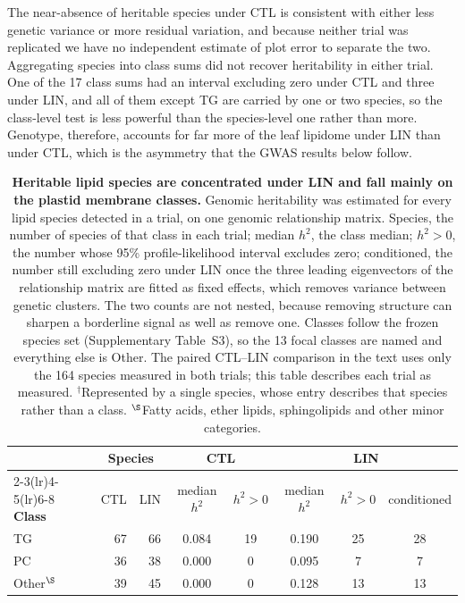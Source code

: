 \documentclass[9pt,twocolumn,twoside]{rilabRxiv}
\begin{document}
The near-absence of heritable species under CTL is consistent with either less genetic variance or more residual variation, and because neither trial was replicated we have no independent estimate of plot error to separate the two. Aggregating species into class sums did not recover heritability in either trial. One of the 17 class sums had an interval excluding zero under CTL and three under LIN, and all of them except TG are carried by one or two species, so the class-level test is less powerful than the species-level one rather than more. Genotype, therefore, accounts for far more of the leaf lipidome under LIN than under CTL, which is the asymmetry that the GWAS results below follow.


\begin{table}[!ht]
\centering
\caption{\textbf{Heritable lipid species are concentrated under LIN and fall mainly on the plastid membrane classes.} Genomic heritability was estimated for every lipid species detected in a trial, on one genomic relationship matrix. Species, the number of species of that class in each trial; median $h^2$, the class median; $h^2>0$, the number whose 95\% profile-likelihood interval excludes zero; conditioned, the number still excluding zero under LIN once the three leading eigenvectors of the relationship matrix are fitted as fixed effects, which removes variance between genetic clusters. The two counts are not nested, because removing structure can sharpen a borderline signal as well as remove one. Classes follow the frozen species set (Supplementary Table~S3), so the 13 focal classes are named and everything else is Other. The paired CTL--LIN comparison in the text uses only the 164 species measured in both trials; this table describes each trial as measured. $^{\dagger}$Represented by a single species, whose entry describes that species rather than a class. $^{\S}$Fatty acids, ether lipids, sphingolipids and other minor categories.}
\label{tab:species_heritability}
\small
\begin{tabular}{lrrccccc}
\toprule
& \multicolumn{2}{c}{\textbf{Species}} & \multicolumn{2}{c}{\textbf{CTL}} & \multicolumn{3}{c}{\textbf{LIN}} \\
\cmidrule(lr){2-3}\cmidrule(lr){4-5}\cmidrule(lr){6-8}
\textbf{Class} & CTL & LIN & median $h^2$ & $h^2>0$ & median $h^2$ & $h^2>0$ & conditioned \\
\midrule
TG & 67 & 66 & 0.084 & 19 & 0.190 & 25 & 28 \\
PC & 36 & 38 & 0.000 & 0 & 0.095 & 7 & 7 \\
Other$^{\S}$ & 39 & 45 & 0.000 & 0 & 0.128 & 13 & 13 \\

\end{tabular}
\end{table}
\end{document}
